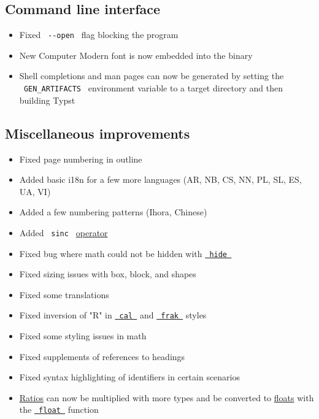\subsection{Command line interface}\label{command-line-interface}

\begin{itemize}
\tightlist
\item
  Fixed \texttt{\ -\/-open\ } flag blocking the program
\item
  New Computer Modern font is now embedded into the binary
\item
  Shell completions and man pages can now be generated by setting the
  \texttt{\ GEN\_ARTIFACTS\ } environment variable to a target directory
  and then building Typst
\end{itemize}

\subsection{Miscellaneous
improvements}\label{miscellaneous-improvements}

\begin{itemize}
\tightlist
\item
  Fixed page numbering in outline
\item
  Added basic i18n for a few more languages (AR, NB, CS, NN, PL, SL, ES,
  UA, VI)
\item
  Added a few numbering patterns (Ihora, Chinese)
\item
  Added \texttt{\ sinc\ } \href{/docs/reference/math/op/}{operator}
\item
  Fixed bug where math could not be hidden with
  \href{/docs/reference/layout/hide/}{\texttt{\ hide\ }}
\item
  Fixed sizing issues with box, block, and shapes
\item
  Fixed some translations
\item
  Fixed inversion of "R" in
  \href{/docs/reference/math/variants/\#functions-cal}{\texttt{\ cal\ }}
  and
  \href{/docs/reference/math/variants/\#functions-frak}{\texttt{\ frak\ }}
  styles
\item
  Fixed some styling issues in math
\item
  Fixed supplements of references to headings
\item
  Fixed syntax highlighting of identifiers in certain scenarios
\item
  \href{/docs/reference/layout/ratio/}{Ratios} can now be multiplied
  with more types and be converted to
  \href{/docs/reference/foundations/float/}{floats} with the
  \href{/docs/reference/foundations/float/}{\texttt{\ float\ }} function
\end{itemize}

